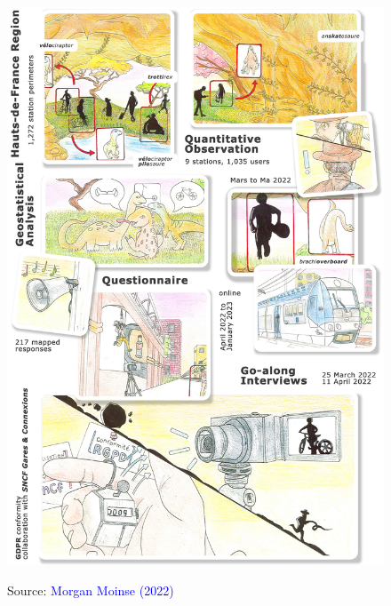 \begin{refsegment}
\begin{figure}[h!]\vspace*{4pt}
        \caption*{}
        \label{graphical-abstract-chap3}
        \centerline{\includegraphics[width=1\columnwidth]{src/Figures/Graphical-abstract/EN_Graphical_abstract_chap3.jpg}}
        \vspace{5pt}
        \begin{flushright}\scriptsize{
        Source: \textcolor{blue}{Morgan Moinse (2022)}
        }\end{flushright}
    \end{figure}


\end{refsegment}
